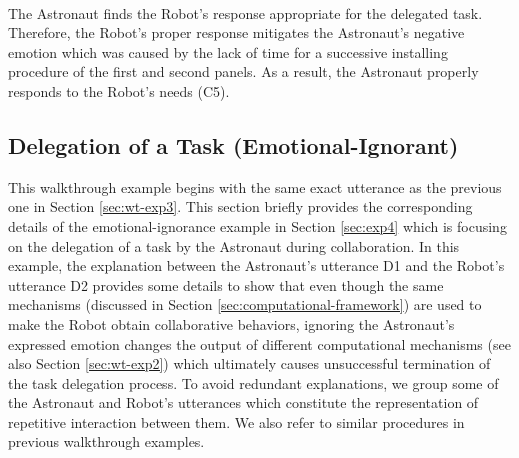 \noindent{}\\

The Astronaut finds the Robot's response appropriate for the delegated task.
Therefore, the Robot's proper response mitigates the Astronaut's negative
emotion which was caused by the lack of time for a successive installing
procedure of the first and second panels. As a result, the Astronaut properly
responds to the Robot's needs (C5).\\

\noindent{}

\subsection{Delegation of a Task (Emotional-Ignorant)}
\label{sec:wt-exp4}

This walkthrough example begins with the same exact utterance as the previous
one in Section \ref{sec:wt-exp3}. This section briefly provides the
corresponding details of the emotional-ignorance example in Section
\ref{sec:exp4} which is focusing on the delegation of a task by the Astronaut during
collaboration. In this example, the explanation between the Astronaut's
utterance D1 and the Robot's utterance D2 provides some details to show that
even though the same mechanisms (discussed in Section
\ref{sec:computational-framework}) are used to make the Robot obtain
collaborative behaviors, ignoring the Astronaut's expressed emotion changes the
output of different computational mechanisms (see also Section
\ref{sec:wt-exp2}) which ultimately causes unsuccessful termination of the task
delegation process. To avoid redundant explanations, we group some of the
Astronaut and Robot's utterances which constitute the representation of
repetitive interaction between them. We also refer to similar procedures in
previous walkthrough examples.\\

\noindent{}\\


